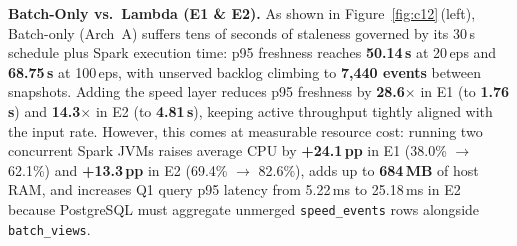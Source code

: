 \documentclass[10pt,a4paper]{article}
\begin{document}
\begin{table}[htbp]
\centering
{}
\caption{Aggregated benchmark results (mean over 2 runs per group; Diff = $\max(|\text{count\_diff}|, |\text{sum\_diff\_cents}|)$). Q1 p95 in ms.}
\label{tab:agg}
\end{table}

\textbf{Batch-Only vs.\ Lambda (E1 \& E2).}
As shown in Figure~\ref{fig:c12}\,(left), Batch-only (Arch~A) suffers tens of seconds of staleness governed by its 30\,s schedule plus Spark execution time: p95 freshness reaches \textbf{50.14\,s} at 20\,eps and \textbf{68.75\,s} at 100\,eps, with unserved backlog climbing to \textbf{7,440 events} between snapshots. Adding the speed layer reduces p95 freshness by \textbf{28.6$\times$} in E1 (to \textbf{1.76\,s}) and \textbf{14.3$\times$} in E2 (to \textbf{4.81\,s}), keeping active throughput tightly aligned with the input rate. However, this comes at measurable resource cost: running two concurrent Spark JVMs raises average CPU by \textbf{+24.1\,pp} in E1 (38.0\% $\rightarrow$ 62.1\%) and \textbf{+13.3\,pp} in E2 (69.4\% $\rightarrow$ 82.6\%), adds up to \textbf{684\,MB} of host RAM, and increases Q1 query p95 latency from 5.22\,ms to 25.18\,ms in E2 because PostgreSQL must aggregate unmerged \texttt{speed\_events} rows alongside \texttt{batch\_views}.
\end{document}
